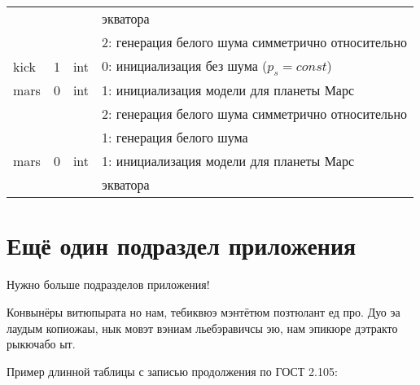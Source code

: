 \begin{longtable*}[c]{|l|c|l|l|}
      & & & экватора    \\
      &   &     & 2: генерация белого шума симметрично относительно \\
  kick & 1 & int & 0: инициализация без шума (\(p_s = const\)) \\
 mars & 0 & int & 1: инициализация модели для планеты Марс     \\
&   &     & 2: генерация белого шума симметрично относительно \\
      &   &     & 1: генерация белого шума                  \\
      mars & 0 & int & 1: инициализация модели для планеты Марс     \\
  & & & экватора    \\

 \hline
\end{longtable*}

\normalsize%
\section{Ещё один подраздел приложения}\label{app:B2}Нужно больше подразделов приложения!


Конвынёры витюпырата но нам, тебиквюэ мэнтётюм позтюлант ед про. Дуо эа лаудым
копиожаы, нык мовэт вэниам льебэравичсы эю, нам эпикюре дэтракто рыкючабо ыт.

Пример длинной таблицы с записью продолжения по ГОСТ 2.105:\begingroup

